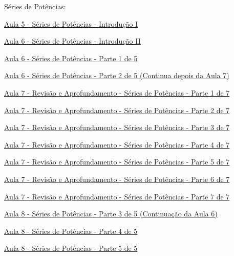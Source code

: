 Séries de Potências:
\begin{listlinks}
  \item \href{https://www.youtube.com/watch?v=M3459ZGJFd4&list=PLxI8Can9yAHeOiMYCBlkyCALloROQ58OY&index=20&t=0s}{Aula 5 - Séries de Potências - Introdução I}
  \item \href{https://www.youtube.com/watch?v=dEIytPdERKQ&list=PLxI8Can9yAHeOiMYCBlkyCALloROQ58OY&index=21&t=0s}{Aula 6 - Séries de Potências - Introdução II}
  \item \href{https://www.youtube.com/watch?v=EigL60vEwCc&list=PLxI8Can9yAHeOiMYCBlkyCALloROQ58OY&index=22&t=0s}{Aula 6 - Séries de Potências - Parte 1 de 5}
  \item \href{https://www.youtube.com/watch?v=MFO89oazdPQ&list=PLxI8Can9yAHeOiMYCBlkyCALloROQ58OY&index=23&t=0s}{Aula 6 - Séries de Potências - Parte 2 de 5 (Continua depois da Aula 7)}
  \item \href{https://www.youtube.com/watch?v=HqnYPbD3xvk&list=PLxI8Can9yAHeOiMYCBlkyCALloROQ58OY&index=24&t=0s}{Aula 7 - Revisão e Aprofundamento - Séries de Potências - Parte 1 de 7 }
  \item \href{https://www.youtube.com/watch?v=w0L8c4MkDjE&list=PLxI8Can9yAHeOiMYCBlkyCALloROQ58OY&index=25&t=0s}{Aula 7 - Revisão e Aprofundamento - Séries de Potências - Parte 2 de 7 }
  \item \href{https://www.youtube.com/watch?v=uIX-OaOat_8&list=PLxI8Can9yAHeOiMYCBlkyCALloROQ58OY&index=26&t=0s}{Aula 7 - Revisão e Aprofundamento - Séries de Potências - Parte 3 de 7 }
  \item \href{https://www.youtube.com/watch?v=HYSzJ3VKNaw&list=PLxI8Can9yAHeOiMYCBlkyCALloROQ58OY&index=27&t=0s}{Aula 7 - Revisão e Aprofundamento - Séries de Potências - Parte 4 de 7 }
  \item \href{https://www.youtube.com/watch?v=Y9Prh7iYVcg&list=PLxI8Can9yAHeOiMYCBlkyCALloROQ58OY&index=28&t=0s}{Aula 7 - Revisão e Aprofundamento - Séries de Potências - Parte 5 de 7 }
  \item \href{https://www.youtube.com/watch?v=NCxoy1Ncw8A&list=PLxI8Can9yAHeOiMYCBlkyCALloROQ58OY&index=29&t=0s}{Aula 7 - Revisão e Aprofundamento - Séries de Potências - Parte 6 de 7 }
  \item \href{https://www.youtube.com/watch?v=FcXHCFG2hDw&list=PLxI8Can9yAHeOiMYCBlkyCALloROQ58OY&index=30&t=0s}{Aula 7 - Revisão e Aprofundamento - Séries de Potências - Parte 7 de 7 }
  \item \href{https://www.youtube.com/watch?v=ZkP8S6-2Ljo&list=PLxI8Can9yAHeOiMYCBlkyCALloROQ58OY&index=31&t=0s}{Aula 8 - Séries de Potências - Parte 3 de 5 (Continuação da Aula 6)}
  \item \href{https://www.youtube.com/watch?v=8ad2ly1clvc&list=PLxI8Can9yAHeOiMYCBlkyCALloROQ58OY&index=32&t=0s}{Aula 8 - Séries de Potências - Parte 4 de 5}
  \item \href{https://www.youtube.com/watch?v=Dmiud-Xoy0A&list=PLxI8Can9yAHeOiMYCBlkyCALloROQ58OY&index=33&t=0s}{Aula 8 - Séries de Potências - Parte 5 de 5}
\end{listlinks}

